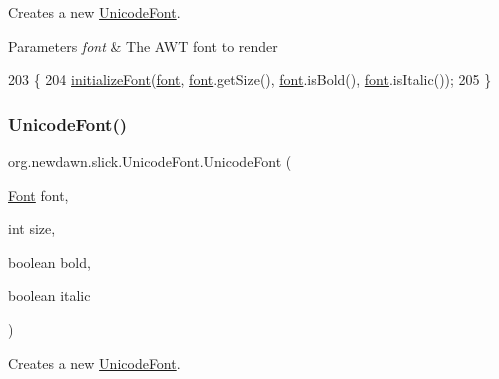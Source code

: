 Creates a new \mbox{\hyperlink{classorg_1_1newdawn_1_1slick_1_1_unicode_font}{Unicode\+Font}}.


\begin{DoxyParams}{Parameters}
{\em font} & The A\+WT font to render \\
\hline
\end{DoxyParams}

\begin{DoxyCode}
203                                    \{
204         \mbox{\hyperlink{classorg_1_1newdawn_1_1slick_1_1_unicode_font_a50d0619aea65cc8ebdc66a2d7c63aede}{initializeFont}}(\mbox{\hyperlink{classorg_1_1newdawn_1_1slick_1_1_unicode_font_a956ab491839be375d47444a67ebff11c}{font}}, \mbox{\hyperlink{classorg_1_1newdawn_1_1slick_1_1_unicode_font_a956ab491839be375d47444a67ebff11c}{font}}.getSize(), \mbox{\hyperlink{classorg_1_1newdawn_1_1slick_1_1_unicode_font_a956ab491839be375d47444a67ebff11c}{font}}.isBold(), 
      \mbox{\hyperlink{classorg_1_1newdawn_1_1slick_1_1_unicode_font_a956ab491839be375d47444a67ebff11c}{font}}.isItalic());
205     \}
\end{DoxyCode}
\mbox{\label{classorg_1_1newdawn_1_1slick_1_1_unicode_font_a19c849491394423ffa20c374d7484e59}} 
\subsubsection{\texorpdfstring{Unicode\+Font()}{UnicodeFont()}\hspace{0.1cm}{\footnotesize\ttfamily [7/7]}}
{\footnotesize\ttfamily org.\+newdawn.\+slick.\+Unicode\+Font.\+Unicode\+Font (\begin{DoxyParamCaption}\item[{\mbox{\hyperlink{interfaceorg_1_1newdawn_1_1slick_1_1_font}{Font}}}]{font,  }\item[{int}]{size,  }\item[{boolean}]{bold,  }\item[{boolean}]{italic }\end{DoxyParamCaption})\hspace{0.3cm}{\ttfamily [inline]}}

Creates a new \mbox{\hyperlink{classorg_1_1newdawn_1_1slick_1_1_unicode_font}{Unicode\+Font}}.


